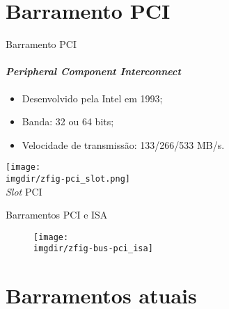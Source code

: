 \def\thetitle{Barramento PCI}
\section{\thetitle}

\begin{frame}{\thetitle}
  \framesubtitle{{\em Peripheral Component Interconnect}}
  
  \begin{itemize}
  \item Desenvolvido pela Intel em 1993;
  \item Banda: 32 ou 64 bits;
  \item Velocidade de transmissão: 133/266/533 MB/s.
  \end{itemize}
\begin{center}
  \texttt{[image: \\imgdir/zfig-pci\_slot.png]}\\
  {\small {\em Slot} PCI}
\end{center}
\end{frame}

\begin{frame}{Barramentos PCI e ISA}
\begin{figure}[h]
  \texttt{[image: \\imgdir/zfig-bus-pci\_isa]}
\end{figure}
\end{frame}

\def\thetitle{Barramentos atuais}
\section{\thetitle}

